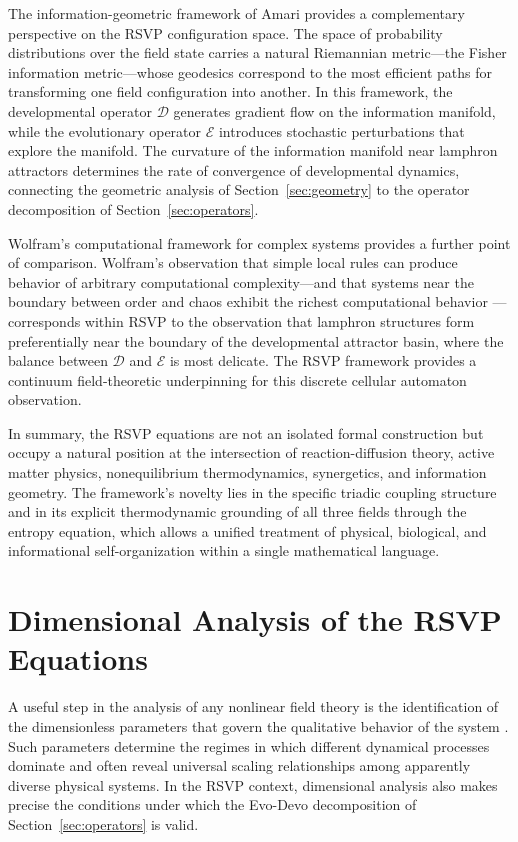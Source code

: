 \documentclass[12pt]{article}
\begin{document}
The information-geometric framework of Amari \cite{amari2016} provides a complementary perspective on the RSVP configuration space. The space of probability distributions over the field state carries a natural Riemannian metric---the Fisher information metric---whose geodesics correspond to the most efficient paths for transforming one field configuration into another. In this framework, the developmental operator $\mathcal{D}$ generates gradient flow on the information manifold, while the evolutionary operator $\mathcal{E}$ introduces stochastic perturbations that explore the manifold. The curvature of the information manifold near lamphron attractors determines the rate of convergence of developmental dynamics, connecting the geometric analysis of Section~\ref{sec:geometry} to the operator decomposition of Section~\ref{sec:operators}.

Wolfram's computational framework for complex systems \cite{wolfram2002} provides a further point of comparison. Wolfram's observation that simple local rules can produce behavior of arbitrary computational complexity---and that systems near the boundary between order and chaos exhibit the richest computational behavior \cite{langton1990}---corresponds within RSVP to the observation that lamphron structures form preferentially near the boundary of the developmental attractor basin, where the balance between $\mathcal{D}$ and $\mathcal{E}$ is most delicate. The RSVP framework provides a continuum field-theoretic underpinning for this discrete cellular automaton observation.

In summary, the RSVP equations are not an isolated formal construction but occupy a natural position at the intersection of reaction-diffusion theory, active matter physics, nonequilibrium thermodynamics, synergetics, and information geometry. The framework's novelty lies in the specific triadic coupling structure and in its explicit thermodynamic grounding of all three fields through the entropy equation, which allows a unified treatment of physical, biological, and informational self-organization within a single mathematical language.

\section{Dimensional Analysis of the RSVP Equations}
\label{sec:dimensionless}

A useful step in the analysis of any nonlinear field theory is the identification of the dimensionless parameters that govern the qualitative behavior of the system \cite{goldenfeld1992,strogatz1994}. Such parameters determine the regimes in which different dynamical processes dominate and often reveal universal scaling relationships among apparently diverse physical systems. In the RSVP context, dimensional analysis also makes precise the conditions under which the Evo-Devo decomposition of Section~\ref{sec:operators} is valid.
\end{document}
